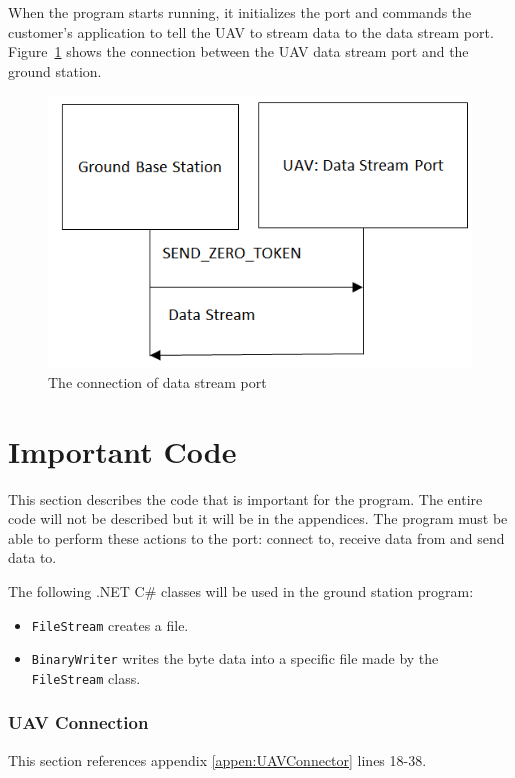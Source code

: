 When the program starts running, it initializes the port and commands the customer's application to tell the UAV to stream data to the data stream port. Figure~\ref{GCS_connect_command} shows the connection between the UAV data stream port and the ground station.

\begin{figure}[!hbtp]
\begin{center}
\includegraphics[scale=0.5]{figures/connect_command.png} 
\end{center}
\caption{The connection of data stream port\label{GCS_connect_command}}
\end{figure}

 
\section{Important Code}

This section describes the code that is important for the program. The entire code will not be described but it will be in the appendices. The program must be able to perform these actions to the port: connect to, receive data from and send data to. 

The following .NET C\# classes will be used in the ground station program:
\begin{itemize}
	\item \texttt{FileStream} creates a file. 
	\item \texttt{BinaryWriter} writes the byte data into a specific file made by the \texttt{FileStream} class. 
\end{itemize}

\subsubsection*{UAV Connection}
This section references appendix \ref{appen:UAVConnector} lines 18-38.

